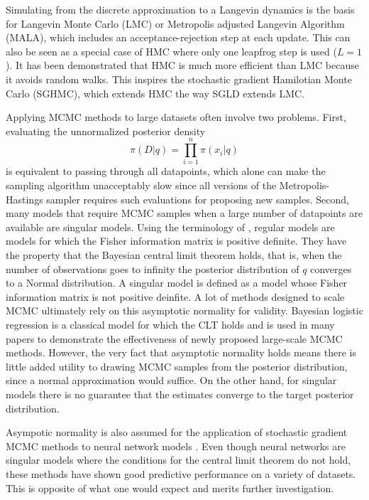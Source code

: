 \documentclass[12pt]{report}
\begin{document}
Simulating from the discrete approximation to a Langevin dynamics is the basis
for Langevin Monte Carlo (LMC) or Metropolis adjusted Langevin Algorithm (MALA), which
includes an acceptance-rejection step at each update. This can also be seen as a
special case of HMC where only one leapfrog step is used ($L=1$). It has been
demonstrated that HMC is much more efficient than LMC because it avoids random
walks. This inspires the
stochastic gradient Hamilotian Monte Carlo (SGHMC), 
which extends HMC the way SGLD extends LMC. 


Applying MCMC methods to large datasets often involve two problems. First, evaluating the unnormalized posterior density
\[ \pi(D|q) = \prod_{i=1}^n \pi(x_i|q) \]
 is equivalent to passing through all datapoints, which alone can make the sampling algorithm unacceptably slow since all versions of the Metropolis-Hastings sampler requires such evaluations for proposing new samples. Second, many models that require MCMC samples when a large number of datapoints are available are singular models. Using the terminology of \cite{watanabe2009algebraic}, regular models are models for which the Fisher information matrix is positive definite. They have the property that the Bayesian central limit theorem \cite{le2012asymptotic} holds, that is, when the number of observations goes to infinity the posterior distribution of $q$ converges to a Normal distribution. 
A singular model is defined as a model whose Fisher information matrix is not positive deinfite. A lot of methods designed to scale MCMC \cite{neiswanger2013asymptotically,scott2016bayes} ultimately rely on this asymptotic normality for validity. Bayesian logistic regression is a classical model for which the CLT holds and is used in many papers to demonstrate the effectiveness of newly proposed large-scale MCMC methods. However, the very fact that asymptotic normality holds means there is little added utility to drawing MCMC samples from the posterior distribution, since a normal approximation would suffice. On the other hand, for singular models there is no guarantee that the estimates converge to the target posterior distribution. 

Asympotic normality is also assumed for the application of stochastic gradient MCMC methods to neural network models \cite{welling2011bayesian,chen2014stochastic,ahn2012bayesian,ding2014bayesian,ma2015complete}. Even though neural networks are singular models where the conditions for the central limit theorem do not hold, these methods have shown good predictive performance on a variety of datasets. This is opposite of what one would expect and merits further investigation.
\end{document}
